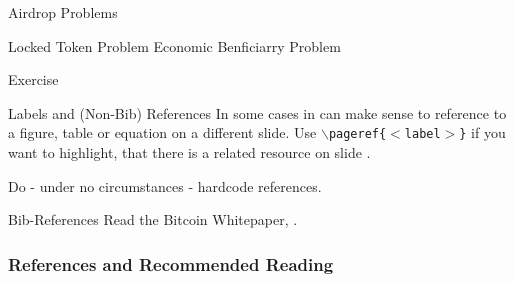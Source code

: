 \documentclass[handout]{beamer}
\begin{document}
\begin{frame}{Airdrop Problems}
	\vspace{1.5em}
	\scalebox{0.66}{
	
		\begin{tikzpicture}
			
		\end{tikzpicture}
	}	
	
\end{frame}


\begin{frame}{Locked Token Problem  Economic Benficiarry Problem}
\vspace{1em}
\scalebox{0.65}{
\begin{tikzpicture}
  
\end{tikzpicture}
}

\end{frame}



\begin{frame}{Exercise}

\end{frame}




\begin{frame}{Labels and (Non-Bib) References}
	In some cases in can make sense to reference to a figure, table or equation on a different slide. Use \texttt{$\backslash$pageref\{$<$label$>$\}} if you want to highlight, that there is a related resource on slide \pageref{fig:logo}.\\ \vspace{1em}
	
	Do - under no circumstances - hardcode references.	
\end{frame}

\begin{frame}{Bib-References}
		Read the Bitcoin Whitepaper, \cite{nakamotoBitcoin2008}.
\end{frame}

\begin{frame}%
\frametitle{References and Recommended Reading}
	
	
\end{frame}
\end{document}
